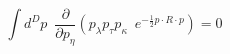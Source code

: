 \begin{equation}\label{dp3}
    \int d^Dp\,\,\,
        \frac{\partial}{\partial p_{\eta}}
    \left(
        p_{\lambda}p_{\tau}p_{\kappa}\,\,\,
        e^{-\frac{1}{2}p\cdot R\cdot p}
    \right)
    =0
\end{equation}

